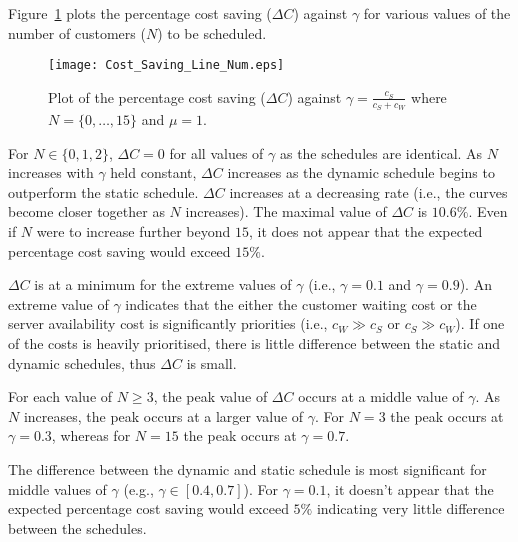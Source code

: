 Figure~\ref{Graph_Cost_Saving} plots the percentage cost saving ($\Delta C$) against $\gamma$ for various values of the number of customers ($N$) to be scheduled. 
\begin{figure}[htb]
	\centering
	\texttt{[image: Cost\_Saving\_Line\_Num.eps]}
	\caption{Plot of the percentage cost saving ($\Delta C$) against $\gamma = \frac{c_{S}}{c_{S} + c_{W}}$ where $N = \{ 0, \ldots, 15 \}$ and $\mu = 1$.}
	\label{Graph_Cost_Saving}
\end{figure}

For $N \in \{ 0, 1, 2 \}$, $\Delta C = 0$ for all values of $\gamma$ as the schedules are identical. As $N$ increases with $\gamma$ held constant, $\Delta C$ increases as the dynamic schedule begins to outperform the static schedule. $\Delta C$ increases at a decreasing rate (i.e., the curves become closer together as $N$ increases). The maximal value of $\Delta C$ is $10.6 \%$. Even if $N$ were to increase further beyond $15$, it does not appear that the expected percentage cost saving would exceed $15 \%$.

$\Delta C$ is at a minimum for the extreme values of $\gamma$ (i.e., $\gamma = 0.1$ and $\gamma = 0.9$). An extreme value of $\gamma$ indicates that the either the customer waiting cost or the server availability cost is significantly priorities (i.e., $c_{W} \gg c_{S}$ or $c_{S} \gg c_{W}$). If one of the costs is heavily prioritised, there is little difference between the static and dynamic schedules, thus $\Delta C$ is small.

For each value of $N \geq 3$, the peak value of $\Delta C$ occurs at a middle value of $\gamma$. As $N$ increases, the peak occurs at a larger value of $\gamma$. For $N = 3$ the peak occurs at $\gamma = 0.3$, whereas for $N = 15$ the peak occurs at $\gamma = 0.7$.

The difference between the dynamic and static schedule is most significant for middle values of $\gamma$ (e.g., $\gamma \in [0.4, 0.7]$). For $\gamma = 0.1$, it doesn't appear that the expected percentage cost saving would exceed $5 \%$ indicating very little difference between the schedules.